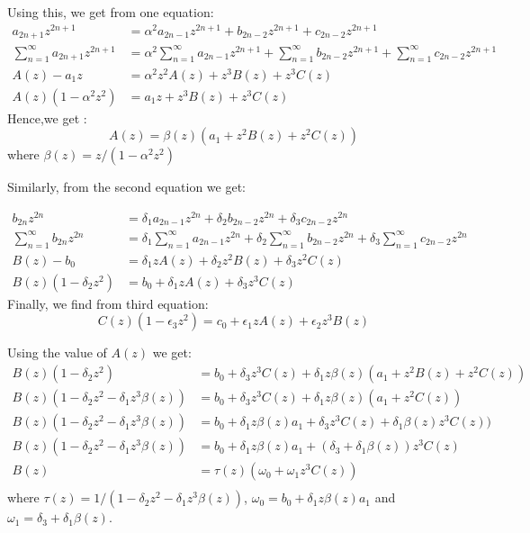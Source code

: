 \documentclass[11pt,a4paper]{article}
\begin{document}
Using this, we get from one equation:
\begin{align}
a_{2n+1}  z^{2n+1}&= \alpha^2 a_{2n-1} z^{2n+1} + b_{2n-2} z^{2n+1} + c_{2n-2} z^{2n+1}\\
\sum_{n=1}^{\infty} a_{2n+1}  z^{2n+1}&= \alpha^2  \sum_{n=1}^{\infty} a_{2n-1} z^{2n+1} +  \sum_{n=1}^{\infty} b_{2n-2} z^{2n+1} +  \sum_{n=1}^{\infty}c_{2n-2} z^{2n+1}\\
A(z) -a_1 z &=\alpha^2  z^2 A(z) +  z^3 B(z) + z^3 C(z)\\
A(z)(1 -\alpha^2  z^2 )  &=  a_1 z +  z^3 B(z) + z^3 C(z)
\end{align}
Hence,we get :
\begin{equation}
\boxed{A(z) =  \beta(z) (a_1  +  z^2 B(z) + z^2 C(z))}
\end{equation}
where $\beta(z)= z/(1 -\alpha^2  z^2 )$

Similarly, from the second equation we get:


\begin{align}
b_{2n}  z^{2n}&= \delta_1 a_{2n-1} z^{2n} + \delta_2 b_{2n-2} z^{2n} +  \delta_3 c_{2n-2} z^{2n}\\
\sum_{n=1}^{\infty} b_{2n}  z^{2n}&=\delta_1   \sum_{n=1}^{\infty}a_{2n-1} z^{2n} + \delta_2  \sum_{n=1}^{\infty}  b_{2n-2} z^{2n} +  \delta_3 \sum_{n=1}^{\infty}c_{2n-2} z^{2n}\\
B(z) -b_0 &=\delta_1  z A(z) + \delta_2 z^2 B(z) + \delta_3 z^2 C(z)\\
B(z)(1 - \delta_2 z^2 )  &=  b_0 + \delta_1  z A(z) +  \delta_3 z^3 C(z)
\end{align}
Finally, we find from third equation:
\begin{equation}
C(z)(1 - \epsilon_3 z^2 )  =  c_0 + \epsilon_1  z A(z) +  \epsilon_2 z^3 B(z)
\end{equation}

Using the value of $A(z)$ we get:
\begin{align*}
B(z)(1 - \delta_2 z^2 )  &=  b_0 + \delta_3 z^3 C(z) +  \delta_1  z   \beta(z) (a_1  +  z^2 B(z) + z^2 C(z)) \\
B(z)(1 - \delta_2 z^2 -\delta_1  z^3   \beta(z) )  &=  b_0 + \delta_3 z^3 C(z) +  \delta_1  z   \beta(z)  (a_1  +   z^2 C(z)) \\
B(z)(1 - \delta_2 z^2 -\delta_1  z^3   \beta(z) )  &=  b_0 +  \delta_1  z   \beta(z)  a_1 + \delta_3 z^3 C(z) +  \delta_1     \beta(z)   z^3 C(z)) \\
B(z)(1 - \delta_2 z^2 -\delta_1  z^3   \beta(z) )  &=  b_0 +  \delta_1  z   \beta(z)  a_1 + (\delta_3 +  \delta_1     \beta(z) )  z^3 C(z) \\
B(z)  &=  \tau(z) ( \omega_0+    \omega_1 z^3 C(z) )\\
\end{align*}
where $\tau(z) = 1/ (1 - \delta_2 z^2 -\delta_1  z^3   \beta(z) )$,  $\omega_0= b_0 +  \delta_1  z   \beta(z)  a_1 $ and $\omega_1= \delta_3 +  \delta_1     \beta(z) $.
\end{document}
